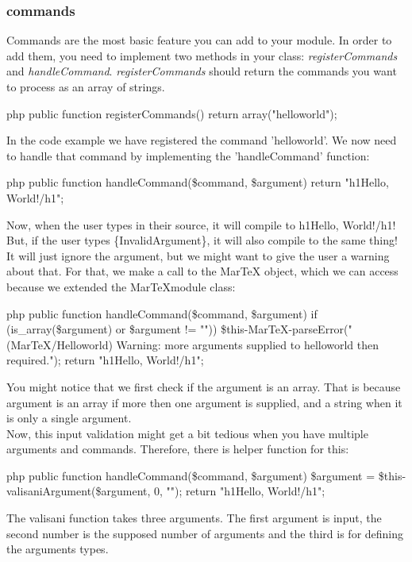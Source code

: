 \subsubsection{commands}
Commands are the most basic feature you can add to your module. In order to add them, you need to implement two methods in your class: \textit{registerCommands} and \textit{handleCommand}.
\textit{registerCommands} should return the commands you want to process as an array of strings.
\begin{code}{php}
public function registerCommands() {
  return array("helloworld");
}
\end{code}
In the code example we have registered the command 'helloworld'. We now need to handle that command by implementing the 'handleCommand' function:
\begin{code}{php}
public function handleCommand(\$command, \$argument) {
  return "\<h1\>Hello, World!\</h1\>";
}
\end{code}
Now, when the user types \backslashhelloworld in their source, it will compile to \<h1\>Hello, World!\</h1\>! But, if the user types \backslashhelloworld\{InvalidArgument\}, it will also
compile to the same thing! It will just ignore the argument, but we might want to give the user a warning about that. For that, we make a call to the MarTeX object, which we can
access because we extended the MarTeXmodule class:
\begin{code}{php}
public function handleCommand(\$command, \$argument) {
  if (is_array(\$argument) or \$argument != "")) {
    \$this-\>MarTeX-\>parseError("(MarTeX/Helloworld) Warning: more arguments supplied to helloworld then required.");
  }
  return "\<h1\>Hello, World!\</h1\>";
}
\end{code}
You might notice that we first check if the argument is an array. That is because argument is an array if more then one argument is supplied, and a string when it is only a single argument. \\
Now, this input validation might get a bit tedious when you have multiple arguments and commands. Therefore, there is helper function for this:
\begin{code}{php}
public function handleCommand(\$command, \$argument) {
  \$argument = \$this-\>valisaniArgument(\$argument, 0, "");
  return "\<h1\>Hello, World!\</h1\>";
}
\end{code}
The valisani function takes three arguments. The first argument is input, the second number is the supposed number of arguments and the third is for defining the arguments types.


